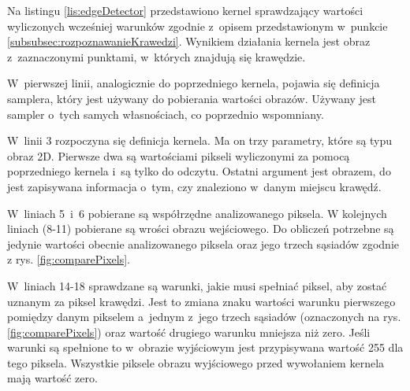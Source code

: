 Na listingu \ref{lis:edgeDetector} przedstawiono kernel sprawdzający wartości wyliczonych wcześniej warunków zgodnie z~opisem przedstawionym w~punkcie \ref{subsubsec:rozpoznawanieKrawedzi}. Wynikiem działania kernela jest obraz z~zaznaczonymi punktami, w~których znajdują się krawędzie.

W~pierwszej linii, analogicznie do poprzedniego kernela, pojawia się definicja samplera, który jest używany do pobierania wartości obrazów. Używany jest sampler o~tych samych własnościach, co poprzednio wspomniany.

W~linii 3 rozpoczyna się definicja kernela. Ma on trzy parametry, które są typu obraz 2D. Pierwsze dwa są wartościami pikseli wyliczonymi za pomocą poprzedniego kernela i~są tylko do odczytu. Ostatni argument jest obrazem, do jest zapisywana informacja o~tym, czy znaleziono w~danym miejscu krawędź.

W~liniach 5~i~6 pobierane są współrzędne analizowanego piksela. W kolejnych liniach (8-11) pobierane są wrości obrazu wejściowego. Do obliczeń potrzebne są jedynie wartości obecnie analizowanego piksela oraz jego trzech sąsiadów zgodnie z rys. \ref{fig:comparePixels}.

W~liniach 14-18 sprawdzane są warunki, jakie musi spełniać piksel, aby zostać uznanym za piksel krawędzi. Jest to zmiana znaku wartości warunku pierwszego pomiędzy danym pikselem a~jednym z~jego trzech sąsiadów (oznaczonych na rys. \ref{fig:comparePixels}) oraz wartość drugiego warunku mniejsza niż zero. Jeśli warunki są spełnione to w~obrazie wyjściowym jest przypisywana wartość 255 dla tego piksela. Wszystkie piksele obrazu wyjściowego przed wywołaniem kernela mają wartość zero.

